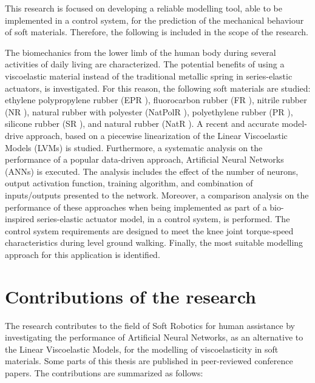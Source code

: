 This research is focused on developing a reliable modelling tool, able to be implemented in a control system, for the prediction of the mechanical behaviour of soft materials. Therefore, the following is included in the scope of the research. 

The biomechanics from the lower limb of the human body during several activities of daily living are characterized. The potential benefits of using a viscoelastic material instead of the traditional metallic spring in series-elastic actuators, is investigated. For this reason, the following soft materials are studied: ethylene polypropylene rubber (EPR \cite{EPRubber2019}), fluorocarbon rubber (FR \cite{FRubber2019}), nitrile rubber (NR \cite{NRubber2019}), natural rubber with polyester (NatPolR \cite{NatPolRubber2019}),  polyethylene  rubber  (PR \cite{PRubber2019}),  silicone  rubber  (SR \cite{SRubber2019}), and natural rubber (NatR \cite{NatRubber2019}). A recent and accurate model-drive approach, based on a piecewise linearization of the Linear Viscoelastic Models (LVMs) is studied. Furthermore, a systematic analysis on the performance of a popular data-driven approach, Artificial Neural Networks (ANNs) is executed. The analysis includes the effect of the number of neurons, output activation function, training algorithm, and combination of inputs/outputs presented to the network. Moreover, a comparison analysis on the performance of these approaches when being implemented as part of a bio-inspired series-elastic actuator model, in a control system, is performed. The control system requirements are designed to meet the knee joint torque-speed characteristics during level ground walking. Finally, the most suitable modelling approach for this application is identified.

\section{Contributions of the research}

The research contributes to the field of Soft Robotics for human assistance by investigating the performance of Artificial Neural Networks, as an alternative to the Linear Viscoelastic Models, for the modelling of viscoelasticity in soft materials. Some parts of this thesis are published in peer-reviewed conference papers. The contributions are summarized as follows:

